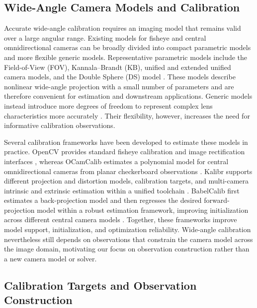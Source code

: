 \documentclass[letterpaper, 10 pt, conference]{ieeeconf}  %
\begin{document}
\subsection{Wide-Angle Camera Models and Calibration}

Accurate wide-angle calibration requires an imaging model that remains
valid over a large angular range. Existing models for fisheye and central
omnidirectional cameras can be broadly divided into compact parametric
models and more flexible generic models. Representative parametric
models include the Field-of-View (FOV), Kannala--Brandt (KB), unified
and extended unified camera models, and the Double Sphere (DS) model
\cite{devernay2001straight,
      kannala2006generic,
      mei2007single,
      khomutenko2016enhanced,
      usenko2018double}.
These models describe nonlinear wide-angle projection with a small
number of parameters and are therefore convenient for estimation and
downstream applications. Generic models instead introduce more degrees
of freedom to represent complex lens characteristics more accurately
\cite{scaramuzza2006flexible,
      schops2020having,
      ramalingam2017unifying}.
Their flexibility, however, increases the need for informative
calibration observations.

Several calibration frameworks have been developed to estimate these
models in practice. OpenCV provides standard fisheye calibration and
image rectification interfaces
\cite{bradski2000opencv,opencvFisheyeDocs}, whereas OCamCalib estimates
a polynomial model for central omnidirectional cameras from planar
checkerboard observations
\cite{scaramuzza2006toolbox}.
Kalibr supports different projection and distortion models, calibration
targets, and multi-camera intrinsic and extrinsic estimation within a
unified toolchain
\cite{rehder2016extending}.
BabelCalib first estimates a back-projection model and then regresses the
desired forward-projection model within a robust estimation framework,
improving initialization across different central camera models
\cite{lochman2021babelcalib}.
Together, these frameworks improve model support, initialization, and
optimization reliability. Wide-angle calibration nevertheless still
depends on observations that constrain the camera model across the image
domain, motivating our focus on observation construction rather than a
new camera model or solver.


\subsection{Calibration Targets and Observation Construction}
\end{document}
